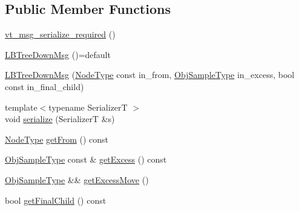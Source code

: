 \subsection*{Public Member Functions}
\begin{DoxyCompactItemize}
\item 
\hyperlink{structvt_1_1vrt_1_1collection_1_1lb_1_1_l_b_tree_down_msg_a6e7ce858dcd96d87f35726e51b7e20ae}{vt\+\_\+msg\+\_\+serialize\+\_\+required} ()
\item 
\hyperlink{structvt_1_1vrt_1_1collection_1_1lb_1_1_l_b_tree_down_msg_ab98ef9e015d68d2d6f8491d05eb1bfd4}{L\+B\+Tree\+Down\+Msg} ()=default
\item 
\hyperlink{structvt_1_1vrt_1_1collection_1_1lb_1_1_l_b_tree_down_msg_a4728ca0d578d08d8e90862a07ddf1b53}{L\+B\+Tree\+Down\+Msg} (\hyperlink{namespacevt_a866da9d0efc19c0a1ce79e9e492f47e2}{Node\+Type} const in\+\_\+from, \hyperlink{structvt_1_1vrt_1_1collection_1_1lb_1_1_hier_l_b_types_a597a60d517207b90e8c7984eac434e8f}{Obj\+Sample\+Type} in\+\_\+excess, bool const in\+\_\+final\+\_\+child)
\item 
{\footnotesize template$<$typename SerializerT $>$ }\\void \hyperlink{structvt_1_1vrt_1_1collection_1_1lb_1_1_l_b_tree_down_msg_a13f9e708fad12e306592dcbc1bf66171}{serialize} (SerializerT \&s)
\item 
\hyperlink{namespacevt_a866da9d0efc19c0a1ce79e9e492f47e2}{Node\+Type} \hyperlink{structvt_1_1vrt_1_1collection_1_1lb_1_1_l_b_tree_down_msg_af1656dcca58e338b16f856a45eb49dd3}{get\+From} () const
\item 
\hyperlink{structvt_1_1vrt_1_1collection_1_1lb_1_1_hier_l_b_types_a597a60d517207b90e8c7984eac434e8f}{Obj\+Sample\+Type} const  \& \hyperlink{structvt_1_1vrt_1_1collection_1_1lb_1_1_l_b_tree_down_msg_a262abc83d3f5df7e3971d8a837689335}{get\+Excess} () const
\item 
\hyperlink{structvt_1_1vrt_1_1collection_1_1lb_1_1_hier_l_b_types_a597a60d517207b90e8c7984eac434e8f}{Obj\+Sample\+Type} \&\& \hyperlink{structvt_1_1vrt_1_1collection_1_1lb_1_1_l_b_tree_down_msg_a73e7f5d97152582a54d54b634b9e0486}{get\+Excess\+Move} ()
\item 
bool \hyperlink{structvt_1_1vrt_1_1collection_1_1lb_1_1_l_b_tree_down_msg_aab94923c1ba77ba3fc30f5de51706b3e}{get\+Final\+Child} () const
\end{DoxyCompactItemize}
